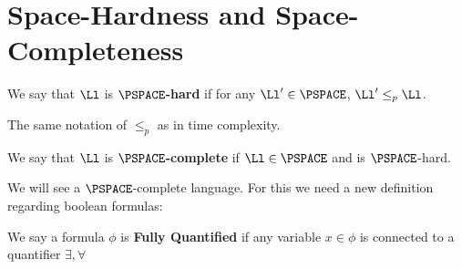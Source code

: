 \section{Space-Hardness and Space-Completeness}
\begin{yellowBox}
	\begin{defn}
		We say that $\Ll$ is \textbf{$\PSPACE$-hard} if for any $\Ll'\in \PSPACE$, $\Ll'\leq_p \Ll$. 
	\end{defn}
\begin{remark}
	The same notation of $\leq_p$ as in time complexity.
\end{remark}
	\begin{defn}
		We say that $\Ll$ is \textbf{$\PSPACE$-complete} if $\Ll\in \PSPACE$ and is $\PSPACE$-hard.
	\end{defn}
\end{yellowBox}
We will see a $\PSPACE$-complete language. For this we need a new definition regarding boolean formulas:
\begin{yellowBox}
	\begin{defn}
		We say a formula $\phi$ is \textbf{Fully Quantified} if any variable $x\in \phi$ is connected to a quantifier $\exists, \forall$
	\end{defn}
\end{yellowBox}
